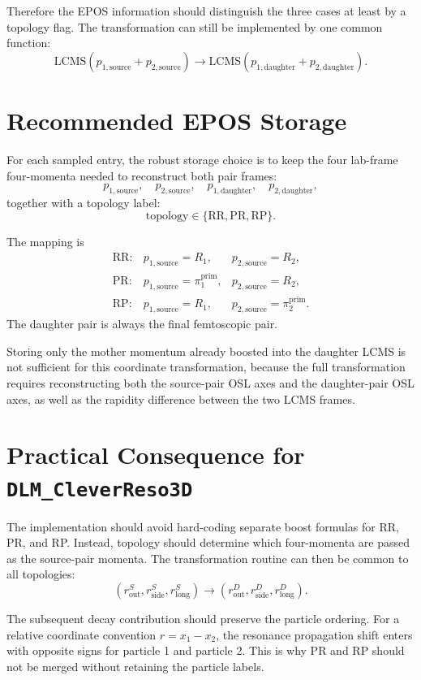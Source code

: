 \documentclass[11pt,a4paper]{article}
\begin{document}
Therefore the EPOS information should distinguish the three cases at least by a
topology flag. The transformation can still be implemented by one common
function:
\[
  \mathrm{LCMS}(p_{1,\mathrm{source}} + p_{2,\mathrm{source}})
  \rightarrow
  \mathrm{LCMS}(p_{1,\mathrm{daughter}} + p_{2,\mathrm{daughter}}).
\]

\section{Recommended EPOS Storage}

For each sampled entry, the robust storage choice is to keep the four lab-frame
four-momenta needed to reconstruct both pair frames:
\[
  p_{1,\mathrm{source}},
  \quad
  p_{2,\mathrm{source}},
  \quad
  p_{1,\mathrm{daughter}},
  \quad
  p_{2,\mathrm{daughter}},
\]
together with a topology label:
\[
  \mathrm{topology} \in \{\mathrm{RR}, \mathrm{PR}, \mathrm{RP}\}.
\]

The mapping is
\[
\begin{array}{lll}
\mathrm{RR}: &
p_{1,\mathrm{source}} = R_1, &
p_{2,\mathrm{source}} = R_2, \\
\mathrm{PR}: &
p_{1,\mathrm{source}} = \pi_1^{\mathrm{prim}}, &
p_{2,\mathrm{source}} = R_2, \\
\mathrm{RP}: &
p_{1,\mathrm{source}} = R_1, &
p_{2,\mathrm{source}} = \pi_2^{\mathrm{prim}}.
\end{array}
\]
The daughter pair is always the final femtoscopic pair.

Storing only the mother momentum already boosted into the daughter LCMS is not
sufficient for this coordinate transformation, because the full transformation
requires reconstructing both the source-pair OSL axes and the daughter-pair OSL
axes, as well as the rapidity difference between the two LCMS frames.

\section{Practical Consequence for \texttt{DLM\_CleverReso3D}}

The implementation should avoid hard-coding separate boost formulas for RR, PR,
and RP. Instead, topology should determine which four-momenta are passed as the
source-pair momenta. The transformation routine can then be common to all
topologies:
\[
  (r_{\mathrm{out}}^S,r_{\mathrm{side}}^S,r_{\mathrm{long}}^S)
  \rightarrow
  (r_{\mathrm{out}}^D,r_{\mathrm{side}}^D,r_{\mathrm{long}}^D).
\]

The subsequent decay contribution should preserve the particle ordering. For a
relative coordinate convention \(r = x_1 - x_2\), the resonance propagation
shift enters with opposite signs for particle 1 and particle 2. This is why PR
and RP should not be merged without retaining the particle labels.
\end{document}
